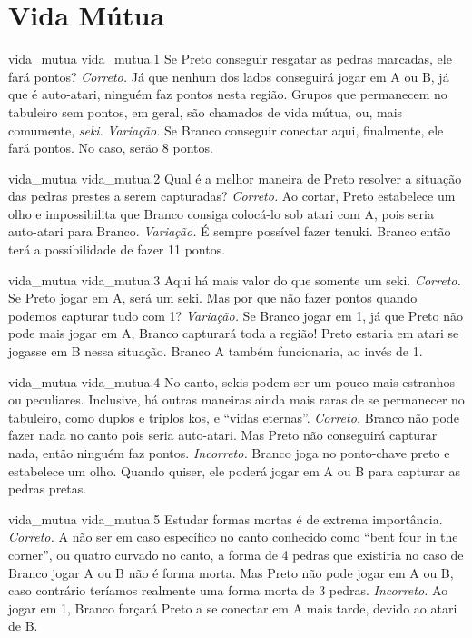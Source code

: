 \chapter{Vida Mútua}

\emptypage

\problemAnswerDiagram
  {vida_mutua}
  {vida_mutua.1}
  {Se Preto conseguir resgatar as pedras marcadas, ele fará pontos?}
  {\emph{Correto.} Já que nenhum dos lados conseguirá jogar em A ou B, já que é auto-atari, ninguém faz pontos nesta região. Grupos que permanecem no tabuleiro sem pontos, em geral, são chamados de vida mútua, ou, mais comumente, \emph{seki}.}
  {\emph{Variação.} Se Branco conseguir conectar aqui, finalmente, ele fará pontos. No caso, serão 8 pontos.}

\problemAnswerDiagram
  {vida_mutua}
  {vida_mutua.2}
  {Qual é a melhor maneira de Preto resolver a situação das pedras prestes a serem capturadas?}
  {\emph{Correto.} Ao cortar, Preto estabelece um olho e impossibilita que Branco consiga colocá-lo sob atari com A, pois seria auto-atari para Branco.}
  {\emph{Variação.} É sempre possível fazer tenuki. Branco então terá a possibilidade de fazer 11 pontos.}

\problemAnswerDiagram
  {vida_mutua}
  {vida_mutua.3}
  {Aqui há mais valor do que somente um seki.}
  {\emph{Correto.} Se Preto jogar em A, será um seki. Mas por que não fazer pontos quando podemos capturar tudo com 1?}
  {\emph{Variação.} Se Branco jogar em 1, já que Preto não pode mais jogar em A, Branco capturará toda a região! Preto estaria em atari se jogasse em B nessa situação. Branco A também funcionaria, ao invés de 1.}

\problemAnswerDiagram
  {vida_mutua}
  {vida_mutua.4}
  {No canto, sekis podem ser um pouco mais estranhos ou peculiares. Inclusive, há outras maneiras ainda mais raras de se permanecer no tabuleiro, como duplos e triplos kos, e ``vidas eternas''.}
  {\emph{Correto.} Branco não pode fazer nada no canto pois seria auto-atari. Mas Preto não conseguirá capturar nada, então ninguém faz pontos.}
  {\emph{Incorreto.} Branco joga no ponto-chave preto e estabelece um olho. Quando quiser, ele poderá jogar em A ou B para capturar as pedras pretas.}

\problemAnswerDiagram
  {vida_mutua}
  {vida_mutua.5}
  {Estudar formas mortas é de extrema importância.}
  {\emph{Correto.} A não ser em caso específico no canto conhecido como ``bent four in the corner'', ou quatro curvado no canto, a forma de 4 pedras que existiria no caso de Branco jogar A ou B não é forma morta. Mas Preto não pode jogar em A ou B, caso contrário teríamos realmente uma forma morta de 3 pedras.}
  {\emph{Incorreto.} Ao jogar em 1, Branco forçará Preto a se conectar em A mais tarde, devido ao atari de B.}